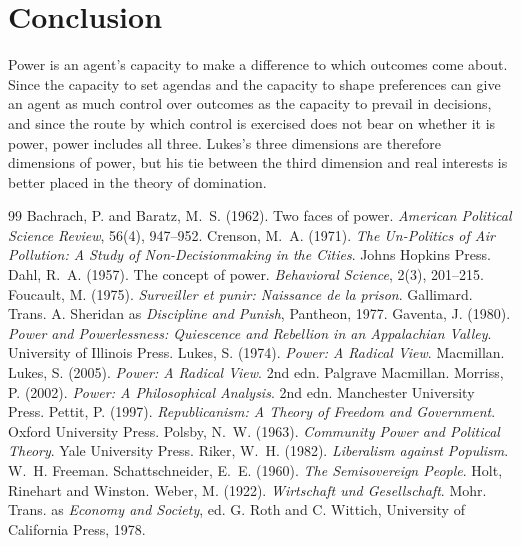 \documentclass{situationist-preprint}
\begin{document}
\section{Conclusion}

Power is an agent's capacity to make a difference to which outcomes come about. Since the capacity to set agendas and the capacity to shape preferences can give an agent as much control over outcomes as the capacity to prevail in decisions, and since the route by which control is exercised does not bear on whether it is power, power includes all three. Lukes's three dimensions are therefore dimensions of power, but his tie between the third dimension and real interests is better placed in the theory of domination.

\begin{thebibliography}{99}\small
{} Bachrach, P. and Baratz, M.~S. (1962). Two faces of power. \emph{American Political Science Review}, 56(4), 947--952.
 Crenson, M.~A. (1971). \emph{The Un-Politics of Air Pollution: A Study of Non-Decisionmaking in the Cities}. Johns Hopkins Press.
 Dahl, R.~A. (1957). The concept of power. \emph{Behavioral Science}, 2(3), 201--215.
 Foucault, M. (1975). \emph{Surveiller et punir: Naissance de la prison}. Gallimard. Trans. A. Sheridan as \emph{Discipline and Punish}, Pantheon, 1977.
 Gaventa, J. (1980). \emph{Power and Powerlessness: Quiescence and Rebellion in an Appalachian Valley}. University of Illinois Press.
 Lukes, S. (1974). \emph{Power: A Radical View}. Macmillan.
 Lukes, S. (2005). \emph{Power: A Radical View}. 2nd edn. Palgrave Macmillan.
 Morriss, P. (2002). \emph{Power: A Philosophical Analysis}. 2nd edn. Manchester University Press.
 Pettit, P. (1997). \emph{Republicanism: A Theory of Freedom and Government}. Oxford University Press.
 Polsby, N.~W. (1963). \emph{Community Power and Political Theory}. Yale University Press.
 Riker, W.~H. (1982). \emph{Liberalism against Populism}. W.~H. Freeman.
 Schattschneider, E.~E. (1960). \emph{The Semisovereign People}. Holt, Rinehart and Winston.
 Weber, M. (1922). \emph{Wirtschaft und Gesellschaft}. Mohr. Trans. as \emph{Economy and Society}, ed. G. Roth and C. Wittich, University of California Press, 1978.
\end{thebibliography}
\end{document}
